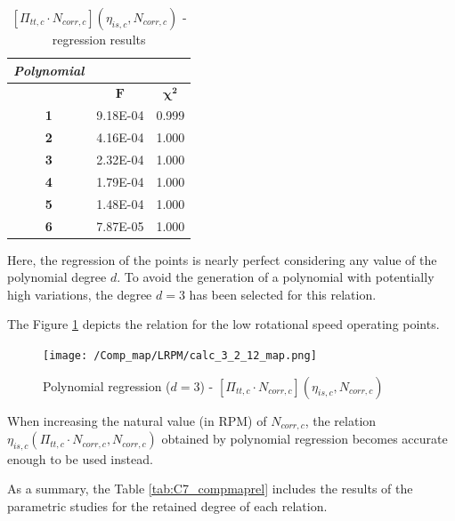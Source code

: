 \begin{longtable}[c]{@{}ccc@{}}
\caption{$[\Pi_{tt,c}\cdot N_{corr,c}](\eta_{is,c},N_{corr,c})$ - regression results }
\label{tab:C7_regcomp5}\\
\toprule
\textit{\textbf{Polynomial}} & &  \\* \midrule
\endfirsthead
%
\endhead
%
\bottomrule
\endfoot
%
\endlastfoot
%
\multicolumn{1}{c}{\textbf{Degree}}              & \multicolumn{1}{c}{$\mathbf{F}$}            & \multicolumn{1}{c}{$\mathbf{\chi^2}$}                  \\
\multicolumn{1}{c}{\textbf{1}}                   & 9.18E-04   & 0.999             \\
\multicolumn{1}{c}{\textbf{2}}                   & 4.16E-04   & 1.000             \\
\multicolumn{1}{c}{\textbf{3}}                   & 2.32E-04   & 1.000             \\
\multicolumn{1}{c}{\textbf{4}}                   & 1.79E-04   & 1.000             \\
\multicolumn{1}{c}{\textbf{5}}                   & 1.48E-04   & 1.000             \\
\multicolumn{1}{c}{\textbf{6}}                   & 7.87E-05   & 1.000             \\* \bottomrule
\end{longtable}
Here, the regression of the points is nearly perfect considering any value of the polynomial degree $d$. To avoid the generation of a polynomial with potentially high variations, the degree $d=3$ has been selected for this relation.

The Figure \ref{fig:C7_polycomp_eta3_LRPM} depicts the relation for the low rotational speed operating points.

\begin{figure}[H]
    \centering
    \texttt{[image: /Comp\_map/LRPM/calc\_3\_2\_12\_map.png]}
    \caption{Polynomial regression ($d=3$) - $[\Pi_{tt,c}\cdot N_{corr,c}](\eta_{is,c},N_{corr,c})$}
    \label{fig:C7_polycomp_eta3_LRPM}
\end{figure}
    
When increasing the natural value (in RPM) of $N_{corr,c}$, the relation $\eta_{is,c}(\Pi_{tt,c}\cdot N_{corr,c},N_{corr,c})$ obtained by polynomial regression becomes accurate enough to be used instead. 

As a summary, the Table \ref{tab:C7_compmaprel} includes the results of the parametric studies for the retained degree of each relation. 

